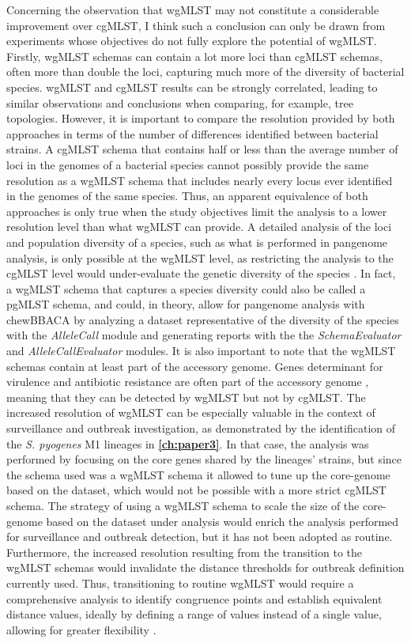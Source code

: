 Concerning the observation that \ac{wgMLST} may not constitute a considerable improvement over \ac{cgMLST}, I think such a conclusion can only be drawn from experiments whose objectives do not fully explore the potential of \ac{wgMLST}. Firstly, \ac{wgMLST} schemas can contain a lot more loci than \ac{cgMLST} schemas, often more than double the loci, capturing much more of the diversity of bacterial species. \ac{wgMLST} and \ac{cgMLST} results can be strongly correlated, leading to similar observations and conclusions when comparing, for example, tree topologies. However, it is important to compare the resolution provided by both approaches in terms of the number of differences identified between bacterial strains. A \ac{cgMLST} schema that contains half or less than the average number of loci in the genomes of a bacterial species cannot possibly provide the same resolution as a \ac{wgMLST} schema that includes nearly every locus ever identified in the genomes of the same species. Thus, an apparent equivalence of both approaches is only true when the study objectives limit the analysis to a lower resolution level than what \ac{wgMLST} can provide. A detailed analysis of the loci and population diversity of a species, such as what is performed in pangenome analysis, is only possible at the \ac{wgMLST} level, as restricting the analysis to the \ac{cgMLST} level would under-evaluate the genetic diversity of the species \cite{tettelin_genome_2005}. In fact, a \ac{wgMLST} schema that captures a species diversity could also be called a \ac{pgMLST} schema, and could, in theory, allow for pangenome analysis with chewBBACA by analyzing a dataset representative of the diversity of the species with the \textit{AlleleCall} module and generating reports with the the \textit{SchemaEvaluator} and \textit{AlleleCallEvaluator} modules. It is also important to note that the \ac{wgMLST} schemas contain at least part of the accessory genome. Genes determinant for virulence and antibiotic resistance are often part of the accessory genome \cite{}, meaning that they can be detected by \ac{wgMLST} but not by \ac{cgMLST}. The increased resolution of \ac{wgMLST} can be especially valuable in the context of surveillance and outbreak investigation, as demonstrated by the identification of the \textit{S. pyogenes} M1 lineages in \textbf{\autoref{ch:paper3}}. In that case, the analysis was performed by focusing on the core genes shared by the lineages' strains, but since the schema used was a \ac{wgMLST} schema it allowed to tune up the core-genome based on the dataset, which would not be possible with a more strict \ac{cgMLST} schema. The strategy of using a \ac{wgMLST} schema to scale the size of the core-genome based on the dataset under analysis would enrich the analysis performed for surveillance and outbreak detection, but it has not been adopted as routine. Furthermore, the increased resolution resulting from the transition to the \ac{wgMLST} schemas would invalidate the distance thresholds for outbreak definition currently used. Thus, transitioning to routine \ac{wgMLST} would require a comprehensive analysis to identify congruence points and establish equivalent distance values, ideally by defining a range of values instead of a single value, allowing for greater flexibility \cite{mixao_multi-country_2025}.

